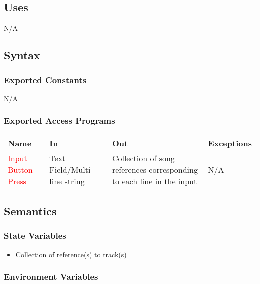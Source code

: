 \documentclass[12pt, titlepage]{article}
\begin{document}
\subsection{Uses}
N/A

\subsection{Syntax}

\subsubsection{Exported Constants}
N/A 

\subsubsection{Exported Access Programs}

\begin{center}
\begin{tabular}{p{2cm} p{4cm} p{4cm} p{2cm}}
\hline
\textbf{Name} & \textbf{In} & \textbf{Out} & \textbf{Exceptions}\\
\hline%
\textcolor{red}{Input Button Press} &Text Field/Multi-line string &Collection of song references corresponding to each line in the input &N/A\\

\hline
\end{tabular}
\end{center}

\subsection{Semantics}

\subsubsection{State Variables}
\begin{itemize}
  \item Collection of reference(s) to track(s)
\end{itemize}

\subsubsection{Environment Variables}

\end{document}

